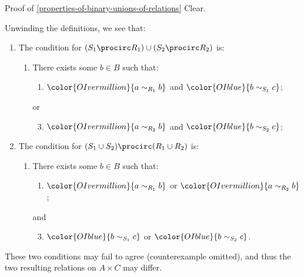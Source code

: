 \begin{Proof}{Proof of \cref{properties-of-binary-unions-of-relations}}%
    Clear.

    Unwinding the definitions, we see that:
    \begin{enumerate}
        \item The condition for $(S_{1}\procirc R_{1})\cup(S_{2}\procirc R_{2})$ is:
            \begin{enumerate}
                \item There exists some $b\in B$ such that:
                    \begin{enumerate}
                        \item $\color{OIvermillion}{a\sim_{R_{1}}b}$ and $\color{OIblue}{b\sim_{S_{1}}c}$;
                    \end{enumerate}
                    or
                    \begin{enumerate}\setcounter{enumi}{2}
                        \item $\color{OIvermillion}{a\sim_{R_{2}}b}$ and $\color{OIblue}{b\sim_{S_{2}}c}$;
                    \end{enumerate}
            \end{enumerate}
        \item The condition for $(S_{1}\cup S_{2})\procirc(R_{1}\cup R_{2})$ is:
            \begin{enumerate}
                \item There exists some $b\in B$ such that:
                    \begin{enumerate}
                        \item $\color{OIvermillion}{a\sim_{R_{1}}b}$ or $\color{OIvermillion}{a\sim_{R_{2}}b}$;
                    \end{enumerate}
                    and
                    \begin{enumerate}\setcounter{enumi}{2}
                        \item $\color{OIblue}{b\sim_{S_{1}}c}$ or $\color{OIblue}{b\sim_{S_{2}}c}$.
                    \end{enumerate}
            \end{enumerate}
    \end{enumerate}
    These two conditions may fail to agree (counterexample omitted), and thus the two resulting relations on $A\times C$ may differ.
\end{Proof}
